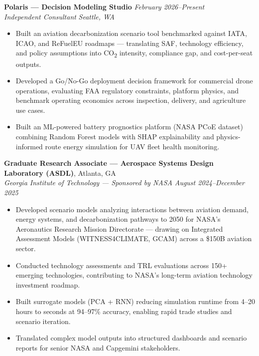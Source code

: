 \documentclass[a4paper,10pt]{article}
\begin{document}
\textbf{Polaris — Decision Modeling Studio} \hfill \textit{February 2026–Present} \\
\textit{Independent Consultant} \hfill \textit{Seattle, WA} \\[3.75pt]
\begin{minipage}[t]{\linewidth}
\begin{itemize}[nosep,after=\strut, leftmargin=1em, itemsep=3pt,label=--]
    \item Built an aviation decarbonization scenario tool benchmarked against IATA, ICAO, and ReFuelEU roadmaps — translating SAF, technology efficiency, and policy assumptions into CO\textsubscript{2} intensity, compliance gap, and cost-per-seat outputs.
    \item Developed a Go/No-Go deployment decision framework for commercial drone operations, evaluating FAA regulatory constraints, platform physics, and benchmark operating economics across inspection, delivery, and agriculture use cases.
    \item Built an ML-powered battery prognostics platform (NASA PCoE dataset) combining Random Forest models with SHAP explainability and physics-informed route energy simulation for UAV fleet health monitoring.
\end{itemize}
\end{minipage}

\vspace{6pt}

\textbf{Graduate Research Associate — Aerospace Systems Design Laboratory (ASDL)}, Atlanta, GA \\
\textit{Georgia Institute of Technology — Sponsored by NASA} \hfill \textit{August 2024–December 2025} \\[3.75pt]
\begin{minipage}[t]{\linewidth}
\begin{itemize}[nosep,after=\strut, leftmargin=1em, itemsep=3pt,label=--]
    \item Developed scenario models analyzing interactions between aviation demand, energy systems, and decarbonization pathways to 2050 for NASA's Aeronautics Research Mission Directorate — drawing on Integrated Assessment Models (WITNESS4CLIMATE, GCAM) across a \$150B aviation sector.
    \item Conducted technology assessments and TRL evaluations across 150+ emerging technologies, contributing to NASA's long-term aviation technology investment roadmap.
    \item Built surrogate models (PCA + RNN) reducing simulation runtime from 4–20 hours to seconds at 94–97\% accuracy, enabling rapid trade studies and scenario iteration.
    \item Translated complex model outputs into structured dashboards and scenario reports for senior NASA and Capgemini stakeholders.
\end{itemize}
\end{minipage}
\end{document}
